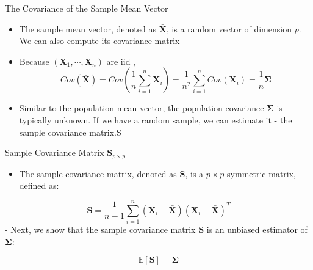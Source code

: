 \documentclass[
  ignorenonframetext,
]{beamer}
\providecommand{\tightlist}{%
  \setlength{\itemsep}{0pt}\setlength{\parskip}{0pt}}
\begin{document}
\begin{frame}{The Covariance of the Sample Mean Vector}
\protect\hypertarget{the-covariance-of-the-sample-mean-vector}{}
\begin{itemize}
\tightlist
\item
  The sample mean vector, denoted as \(\bar{\mathbf{X}}\), is a random
  vector of dimension \(p\). We can also compute its covariance matrix
\item
  Because \((\mathbf X_1, \cdots, \mathbf X_n)\) are iid ,
  \[Cov(\bar{\mathbf{X}}) = Cov(\frac{1}{n}\sum_{i=1}^n \mathbf{X}_i)= \frac{1}{n^2}\sum_{i=1}^n Cov(\mathbf{X}_i)=\frac{1}{n}\boldsymbol \Sigma\]
\item
  Similar to the population mean vector, the population covariance
  \(\boldsymbol \Sigma\) is typically unknown. If we have a random
  sample, we can estimate it - the sample covariance matrix.S
\end{itemize}
\end{frame}

\begin{frame}{Sample Covariance Matrix \(\mathbf{S}_{p\times p}\)}
\protect\hypertarget{sample-covariance-matrix-mathbfs_ptimes-p}{}
\begin{itemize}
\tightlist
\item
  The sample covariance matrix, denoted as \(\mathbf{S}\), is a
  \(p \times p\) symmetric matrix, defined as:
\end{itemize}

\[
\mathbf{S} = \frac{1}{n-1}\sum_{i=1}^n (\mathbf{X}_i - \bar{\mathbf{X}})(\mathbf{X}_i - \bar{\mathbf{X}})^T
\] - Next, we show that the sample covariance matrix \(\mathbf{S}\) is
an unbiased estimator of \(\boldsymbol{\Sigma}\):

\[
\mathbb{E}[\mathbf{S}] = \boldsymbol{\Sigma}
\]
\end{frame}
\end{document}
